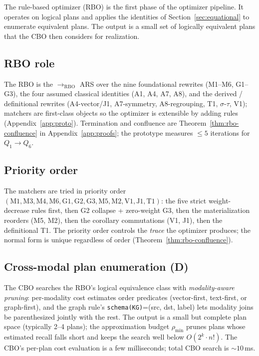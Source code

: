 \documentclass[sigconf]{acmart}
\theoremstyle{plain}
\theoremstyle{definition}
\theoremstyle{remark}
\begin{document}
The rule-based optimizer (RBO) is the first phase of the optimizer
pipeline. It operates on logical plans and applies the identities
of Section~\ref{sec:equational} to enumerate equivalent plans.
The output is a small set of logically equivalent plans that the
CBO then considers for realization.

\subsection{RBO role}\label{sec:rbo:role}

The RBO is the $\to_{\mathrm{RBO}}$ ARS over the nine
foundational rewrites (M1--M6, G1--G3), the four assumed classical
identities (A1, A4, A7, A8), and the derived / definitional
rewrites (A4-vector/J1, A7-symmetry, A8-regrouping, T1,
$\sigma$-$\tau$, V1); matchers are first-class objects so the
optimizer is extensible by adding rules (Appendix~\ref{app:proto}).
Termination and confluence are Theorem~\ref{thm:rbo-confluence} in
Appendix~\ref{app:proofs}; the prototype measures $\le 5$
iterations for $Q_1 \to Q_6$.

\subsection{Priority order}

The matchers are tried in priority order
$(\mathrm{M1, M3, M4, M6, G1, G2, G3, M5, M2, V1, J1, T1})$:
the five strict weight-decrease rules first, then G2 collapse +
zero-weight G3, then the materialization reorders (M5, M2),
then the corollary commutations (V1, J1), then the
definitional T1. The priority order controls the \emph{trace}
the optimizer produces; the normal form is unique regardless
of order (Theorem~\ref{thm:rbo-confluence}).

\subsection{Cross-modal plan enumeration (D)}\label{sec:rbo:crossmodal}

The CBO searches the RBO's logical equivalence class with
\emph{modality-aware pruning}: per-modality cost estimates order
predicates (vector-first, text-first, or graph-first), and the
graph rule's \texttt{schema(KG)}=(src, dst, label) lets modality
joins be parenthesized jointly with the rest. The output is a
small but complete plan space (typically 2--4 plans); the
approximation budget $\rho_{\min}$ prunes plans whose estimated
recall falls short and keeps the search well below
$O(2^k \cdot n!)$. The CBO's per-plan cost evaluation is a few
milliseconds; total CBO search is $\sim 10$\,ms.
\end{document}
